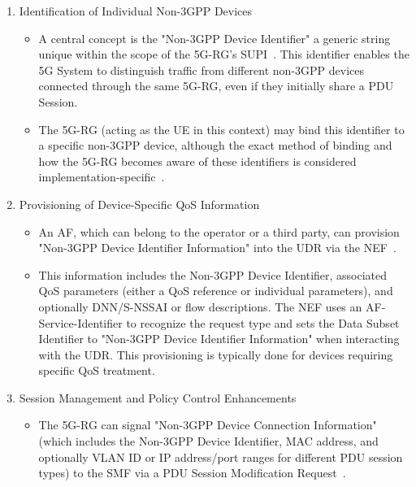 \begin{enumerate}
    \item {
        Identification of Individual Non-\ac{3GPP} Devices
        \begin{itemize}
            \item A central concept is the "Non-\ac{3GPP} Device Identifier" a generic string unique within the scope of the \ac{5G-RG}'s \ac{SUPI}~\cite{23.501-p564}. This identifier enables the \ac{5G} System to distinguish traffic from different non-\ac{3GPP} devices connected through the same \ac{5G-RG}, even if they initially share a \ac{PDU} Session.
            \item The \ac{5G-RG} (acting as the \ac{UE} in this context) may bind this identifier to a specific non-\ac{3GPP} device, although the exact method of binding and how the \ac{5G-RG} becomes aware of these identifiers is considered implementation-specific~\cite{23.501-p564}.
        \end{itemize}
    }
    \item {
        Provisioning of Device-Specific \ac{QoS} Information
        \begin{itemize}
            \item An \ac{AF}, which can belong to the operator or a third party, can provision "Non-\ac{3GPP} Device Identifier Information" into the \ac{UDR} via the \ac{NEF}~\cite{23.502-p447}.
            \item This information includes the Non-\ac{3GPP} Device Identifier, associated \ac{QoS} parameters (either a \ac{QoS} reference or individual parameters), and optionally \ac{DNN}/\ac{S-NSSAI} or flow descriptions. The \ac{NEF} uses an \ac{AF}-Service-Identifier to recognize the request type and sets the Data Subset Identifier to "Non-\ac{3GPP} Device Identifier Information" when interacting with the \ac{UDR}. This provisioning is typically done for devices requiring specific \ac{QoS} treatment.
        \end{itemize}
    }
    \item {
        Session Management and Policy Control Enhancements
        \begin{itemize}
            \item The \ac{5G-RG} can signal "Non-\ac{3GPP} Device Connection Information" (which includes the Non-\ac{3GPP} Device Identifier, \ac{MAC} address, and optionally \ac{VLAN} ID or \ac{IP} address/port ranges for different \ac{PDU} session types) to the \ac{SMF} via a \ac{PDU} Session Modification Request~\cite{23.501-p564}.

\end{itemize}}
\end{enumerate}
